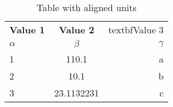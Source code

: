 \documentclass{article}
\begin{document}
	
	
	\begin{table}[h!]	
		\centering
		\caption{Table with aligned units}
		\label{tab:table1}
		\begin{tabular}{l|c|r}
			\textbf{Value 1}& \textbf{Value 2}& textbf{Value 3}\\
			$\alpha$ & $\beta$& $\gamma$\\
			\hline
			1&110.1&a\\
			2&10.1&b\\
			3&23.1132231&c\\
		\end{tabular}
	\end{table}
	
	
\end{document}
